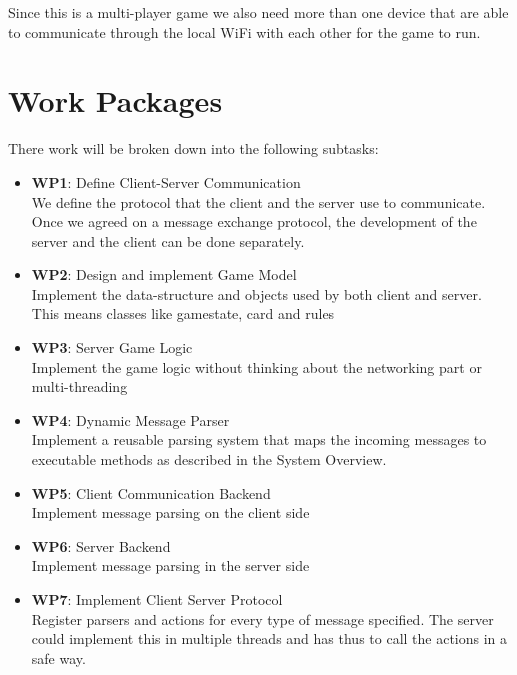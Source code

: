 \documentclass{sig-alternate}
\begin{document}
Since this is a multi-player game we also need more than one device that are able to communicate through the local WiFi with each other for the game to run.

\section{Work Packages}
There work will be broken down into the following subtasks:

\begin{itemize}
	
        \item {\bf WP1}: Define Client-Server Communication\\
        We define the protocol that the client and the server use to communicate. Once we agreed on a message exchange protocol, the development of the server and the client can be done separately.
        
        \item {\bf WP2}: Design and implement Game Model\\
        Implement the data-structure and objects used by both client and server. This means classes like gamestate, card and rules
        
        \item {\bf WP3}: Server Game Logic\\
        Implement the game logic without thinking about the networking part or multi-threading
        
        \item {\bf WP4}: Dynamic Message Parser\\
		Implement a reusable parsing system that maps the incoming messages to executable methods as described in the System Overview.
           
        \item {\bf WP5}: Client Communication Backend\\
		Implement message parsing on the client side
		
		\item {\bf WP6}: Server Backend\\
		Implement message parsing in the server side
		
		\item {\bf WP7}: Implement Client Server Protocol\\
		Register parsers and actions for every type of message specified. The server could implement this in multiple threads and has thus to call the actions in a safe way.
		

\end{itemize}
\end{document}
